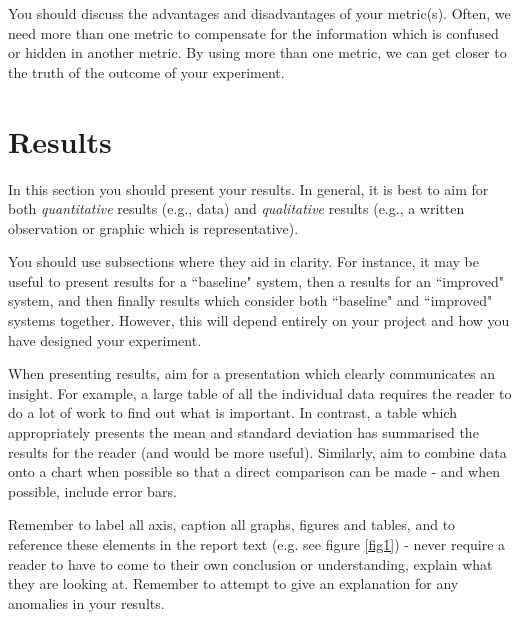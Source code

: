 \documentclass[conference]{IEEEtran}
\begin{document}
 You should discuss the advantages and disadvantages of your metric(s).  Often, we need more than one metric to compensate for the information which is confused or hidden in another metric.  By using more than one metric, we can get closer to the truth of the outcome of your experiment.  

\section{Results}


In this section you should present your results.  In general, it is best to aim for both \emph{quantitative} results (e.g., data) and \emph{qualitative} results (e.g., a written observation or graphic which is representative).  

You should use subsections where they aid in clarity.  For instance, it may be useful to present results for a ``baseline" system, then a results for an ``improved" system, and then finally results which consider both ``baseline" and ``improved" systems together.  However, this will depend entirely on your project and how you have designed your experiment.

When presenting results, aim for a presentation which clearly communicates an insight. For example, a large table of all the individual data requires the reader to do a lot of work to find out what is important.  In contrast, a table which appropriately presents the mean and standard deviation has summarised the results for the reader (and would be more useful).  Similarly, aim to combine data onto a chart when possible so that a direct comparison can be made - and when possible, include error bars.  


Remember to label all axis, caption all graphs, figures and tables, and to reference these elements in the report text (e.g. see figure \ref{fig1}) - never require a reader to have to come to their own conclusion or understanding, explain what they are looking at.  Remember to attempt to give an explanation for any anomalies in your results.  
\end{document}
